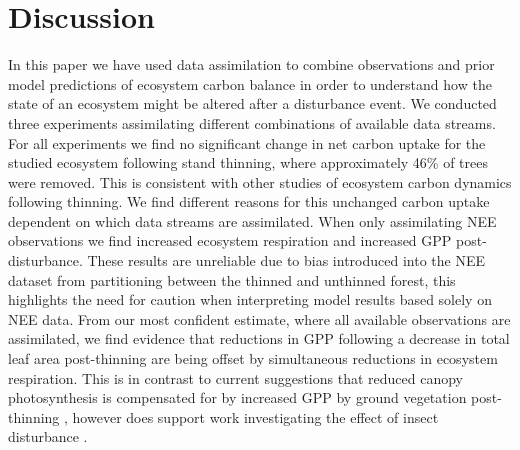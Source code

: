 \documentclass[draft,linenumbers]{agujournal}
\begin{document}
\section{Discussion}
In this paper we have used data assimilation to combine observations and prior model predictions of ecosystem carbon balance in order to understand how the state of an ecosystem might be altered after a disturbance event. We conducted three experiments assimilating different combinations of available data streams. For all experiments we find no significant change in net carbon uptake for the studied ecosystem following stand thinning, where approximately 46\% of trees were removed. This is consistent with other studies of ecosystem carbon dynamics following thinning. We find different reasons for this unchanged carbon uptake dependent on which data streams are assimilated. When only assimilating NEE observations we find increased ecosystem respiration and increased GPP post-disturbance. These results are unreliable due to bias introduced into the NEE dataset from partitioning between the thinned and unthinned forest, this highlights the need for caution when interpreting model results based solely on NEE data. From our most confident estimate, where all available observations are assimilated, we find evidence that reductions in GPP following a decrease in total leaf area post-thinning are being offset by simultaneous reductions in ecosystem respiration. This is in contrast to current suggestions that reduced canopy photosynthesis is compensated for by increased GPP by ground vegetation post-thinning \citep{vesala2005effect, wilkinson2015effects, moreaux2011paired, dore2012recovery}, however does support work investigating the effect of insect disturbance \citep{ELE:ELE12097}.
\end{document}
